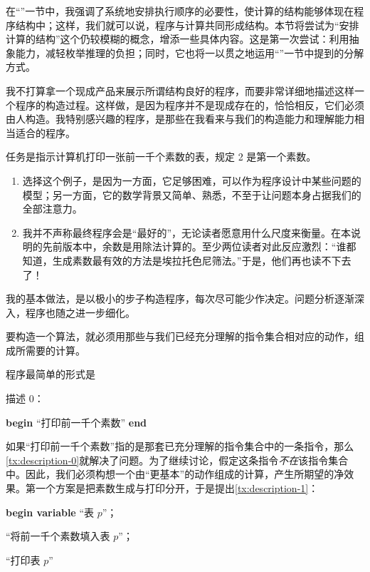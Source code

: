 \documentclass[twoside,11pt,fontset=none]{ctexbook}
\makeatletter
\newcommand{\labeltext}[2]{%
  \@bsphack
  \phantomsection
  \def\@currentlabel{#1}\label{#2}%
  \@esphack
}
\makeatother
\begin{document}
在“”一节中，我强调了系统地安排执行顺序的必要性，使计算的结构能够体现在程序结构中；这样，我们就可以说，程序与计算共同形成结构。本节将尝试为“安排计算的结构”这个仍较模糊的概念，增添一些具体内容。这是第一次尝试：利用抽象能力，减轻枚举推理的负担；同时，它也将一以贯之地运用“”一节中提到的分解方式。

我不打算拿一个现成产品来展示所谓结构良好的程序，而要非常详细地描述这样一个程序的构造过程。这样做，是因为程序并不是现成存在的，恰恰相反，它们必须由人构造。我特别感兴趣的程序，是那些在我看来与我们的构造能力和理解能力相当适合的程序。

任务是指示计算机打印一张前一千个素数的表，规定 2 是第一个素数。

\begin{enumerate}[leftmargin=*, itemindent=2.2\parindent, label=\textit{注 }\arabic*.]
	\item 选择这个例子，是因为一方面，它足够困难，可以作为程序设计中某些问题的模型；另一方面，它的数学背景又简单、熟悉，不至于让问题本身占据我们的全部注意力。
	
	\item 我并不声称最终程序会是“最好的”，无论读者愿意用什么尺度来衡量。在本说明的先前版本中，余数是用除法计算的。至少两位读者对此反应激烈：“谁都知道，生成素数最有效的方法是埃拉托色尼筛法。”于是，他们再也读不下去了！
\end{enumerate}

我的基本做法，是以极小的步子构造程序，每次尽可能少作决定。问题分析逐渐深入，程序也随之进一步细化。

要构造一个算法，就必须用那些与我们已经充分理解的指令集合相对应的动作，组成所需要的计算。

程序最简单的形式是
\medskip


\noindent
描述 0：
\labeltext{描述 0}{tx:description-0}

\textbf{begin} “打印前一千个素数” \textbf{end}

\noindent
如果“打印前一千个素数”指的是那套已充分理解的指令集合中的一条指令，那么\ref{tx:description-0}就解决了问题。为了继续讨论，假定这条指令\textit{不在}该指令集合中。因此，我们必须构想一个由“更基本”的动作组成的计算，产生所期望的净效果。第一个方案是把素数生成与打印分开，于是提出\ref{tx:description-1}：
\medskip

\textbf{begin variable} “表 $p$”；
\labeltext{描述 1}{tx:description-1}

\quad “将前一千个素数填入表 $p$”；

\quad “打印表 $p$”
\end{document}

